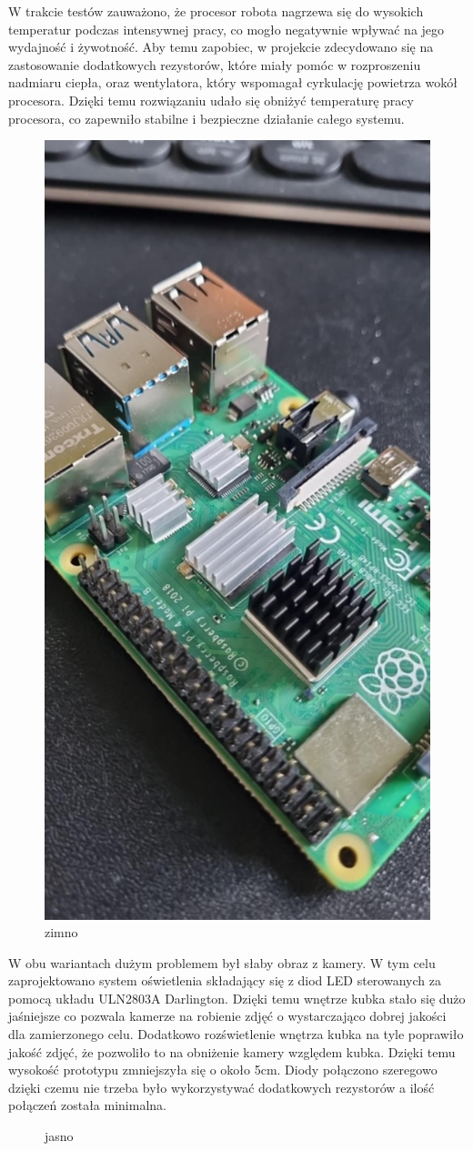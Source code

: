 W trakcie testów zauważono, że procesor robota nagrzewa się do wysokich temperatur podczas intensywnej pracy, 
co mogło negatywnie wpływać na jego wydajność i żywotność. Aby temu zapobiec, w projekcie zdecydowano się na 
zastosowanie dodatkowych rezystorów, które miały pomóc w rozproszeniu nadmiaru ciepła, oraz wentylatora, który 
wspomagał cyrkulację powietrza wokół procesora. Dzięki temu rozwiązaniu udało się obniżyć temperaturę pracy 
procesora, co zapewniło stabilne i bezpieczne działanie całego systemu.

\begin{figure}[H]
    \centering
    \includegraphics[width=0.25\linewidth]{chapters/03-praca-wlasna/figures/now_we_are_cool.png}
    \caption{\label{fig:zimno}zimno}
\end{figure}

W obu wariantach dużym problemem był słaby obraz z kamery. W tym celu zaprojektowano system oświetlenia składający się z diod
LED sterowanych za pomocą układu ULN2803A Darlington. Dzięki temu wnętrze kubka stało się dużo jaśniejsze co pozwala kamerze na
robienie zdjęć o wystarczająco dobrej jakości dla zamierzonego celu. Dodatkowo rozświetlenie wnętrza kubka na tyle poprawiło
jakość zdjęć, że pozwoliło to na obniżenie kamery względem kubka. Dzięki temu wysokość prototypu zmniejszyła się o około 5cm.
Diody połączono szeregowo dzięki czemu nie trzeba było wykorzystywać dodatkowych rezystorów a ilość połączeń
została minimalna.

\begin{figure}[H]
    \centering
    \caption{\label{fig:jasno}jasno}
\end{figure}

